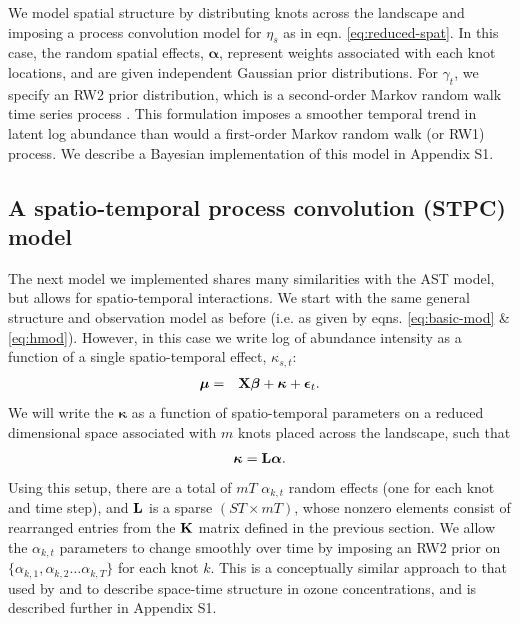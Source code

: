 \documentclass[times,mee,doublespace,]{besauth2}
\begin{document}
We model spatial structure by distributing knots across the landscape and imposing a process convolution model for $\eta_s$ as in eqn. \ref{eq:reduced-spat}.  In this case, the random spatial effects, $\boldsymbol{\alpha}$, represent weights associated with each knot locations, and are given independent Gaussian prior distributions.
For $\gamma_t$, we specify an RW2 prior distribution, which is a second-order Markov random walk time series process \citep{RueHeld2005}.  This formulation imposes a smoother temporal trend in latent log abundance than would a first-order Markov random walk (or RW1) process.  We describe a Bayesian implementation of this model in Appendix S1.

\subsection{A spatio-temporal process convolution (STPC) model}

The next model we implemented shares many similarities with the AST model, but allows for spatio-temporal interactions.  We start
with the same general structure and observation model as before (i.e. as given by eqns. \ref{eq:basic-mod} \& \ref{eq:hmod}).  However, in this case we write log of abundance intensity as a function of a single spatio-temporal
effect, $\kappa_{s,t}$:
\begin{eqnarray*}
  \boldsymbol{\mu} & = & {\bf X} \boldsymbol{\beta} + \boldsymbol{\kappa} + \boldsymbol{\epsilon}_t.
\end{eqnarray*}
We will write the $\boldsymbol{\kappa}$ as a function of spatio-temporal parameters on a reduced dimensional space associated with $m$ knots placed across the landscape, such that
\begin{eqnarray*}
  \boldsymbol{\kappa} = {\bf L} \boldsymbol{\alpha}.
\end{eqnarray*}
Using this setup, there are a total of $mT$ $\alpha_{k,t}$ random effects (one for each knot and time step), and ${\bf L}$ is a sparse $(ST \times mT)$, whose nonzero elements consist of rearranged entries from the ${\bf K}$ matrix defined in the previous section.  We allow the
$\alpha_{k,t}$ parameters to change smoothly over time by imposing an RW2 prior on $\{ \alpha_{k,1}, \alpha_{k,2} \hdots \alpha_{k,T} \}$ for each knot $k$.
This is a conceptually similar approach to that used by \citet{CalderEtAl2002} and \citet{Higdon2002} to describe space-time structure in ozone concentrations, and is described further in Appendix S1.
\end{document}
